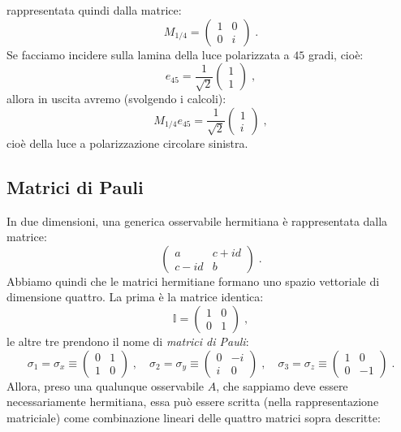 \documentclass[12pt,a4paper]{report}
\theoremstyle{definition}
\numberwithin{equation}{section}
\begin{document}
rappresentata quindi dalla matrice:
$$
M_{1/4}=\left(
\begin{matrix}
1 & 0 \\
0 & i
\end{matrix}\right)\;.
$$
Se facciamo incidere sulla lamina della luce polarizzata a $45$ gradi, cioè:
$$
e_{45}=\frac{1}{\sqrt{2}}\left(
\begin{matrix}
1 \\
1
\end{matrix}\right)\;,
$$
allora in uscita avremo (svolgendo i calcoli):
$$
M_{1/4}e_{45}=\frac{1}{\sqrt{2}}\left(
\begin{matrix}
1	\\
i
\end{matrix}\right)\;,
$$
cioè della luce a polarizzazione circolare sinistra.
\subsection{Matrici di Pauli}
In due dimensioni, una generica osservabile hermitiana è rappresentata dalla matrice:
$$
\left(\begin{matrix}
a & c+id \\
c-id & b
\end{matrix}\right)\;.
$$
Abbiamo quindi che le matrici hermitiane formano uno spazio vettoriale di dimensione quattro. La prima è la matrice identica:
$$
\mathbb{I}=\left(
\begin{matrix}
1 & 0 \\
0 & 1
\end{matrix}\right)\;,
$$
le altre tre prendono il nome di \textit{matrici di Pauli}:
\begin{equation}
\sigma_1=\sigma_x\equiv \left(
\begin{matrix}
0 & 1 \\
1 & 0
\end{matrix}\right)\;,\quad
\sigma_2=\sigma_y\equiv \left(
\begin{matrix}
0 & -i \\
i & 0
\end{matrix}\right)\;,\quad
\sigma_3=\sigma_z\equiv\left(
\begin{matrix}
1 & 0 \\
0 & -1
\end{matrix}\right)\;.
\end{equation}
Allora, preso una qualunque osservabile $A$, che sappiamo deve essere necessariamente hermitiana, essa può essere scritta (nella rappresentazione matriciale) come combinazione lineari delle quattro matrici sopra descritte:
\end{document}
